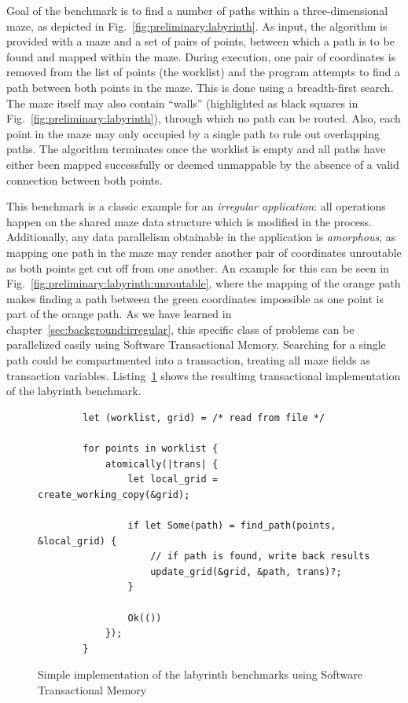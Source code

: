Goal of the benchmark is to find a number of paths within a three-dimensional maze, as depicted in Fig.~\ref{fig:preliminary:labyrinth}.
As input, the algorithm is provided with a maze and a set of pairs of points, between which a path is to be found and mapped within the maze.
During execution, one pair of coordinates is removed from the list of points (the worklist) and the program attempts to find a path between both points in the maze.
This is done using a breadth-first search.
The maze itself may also contain \enquote{walls} (highlighted as black squares in Fig.~\ref{fig:preliminary:labyrinth}), through which no path can be routed.
Also, each point in the maze may only occupied by a single path to rule out overlapping paths.
The algorithm terminates once the worklist is empty and all paths have either been mapped successfully or deemed unmappable by the absence of a valid connection between both points.

This benchmark is a classic example for an \emph{irregular application}: all operations happen on the shared maze data structure which is modified in the process.
Additionally, any data parallelism obtainable in the application is \emph{amorphous}, as mapping one path in the maze may render another pair of coordinates unroutable as both points get cut off from one another.
An example for this can be seen in Fig.~\ref{fig:preliminary:labyrinth:unroutable}, where the mapping of the orange path makes finding a path between the green coordinates impossible as one point is part of the orange path.
As we have learned in chapter~\ref{sec:background:irregular}, this specific class of problems can be parallelized easily using Software Transactional Memory.
Searching for a single path could be compartmented into a transaction, treating all maze fields as transaction variables.
Listing~\ref{fig:preliminaries:stm} shows the resultimg transactional implementation of the labyrinth benchmark.

\begin{figure}[t]
    \begin{verbatim}
        let (worklist, grid) = /* read from file */

        for points in worklist {
            atomically(|trans| {
                let local_grid = create_working_copy(&grid);

                if let Some(path) = find_path(points, &local_grid) {
                    // if path is found, write back results
                    update_grid(&grid, &path, trans)?;
                }

                Ok(())
            });
        }
    \end{verbatim}
    \caption{Simple implementation of the labyrinth benchmarks using Software Transactional Memory}%
    \label{fig:preliminaries:stm}
\end{figure}

